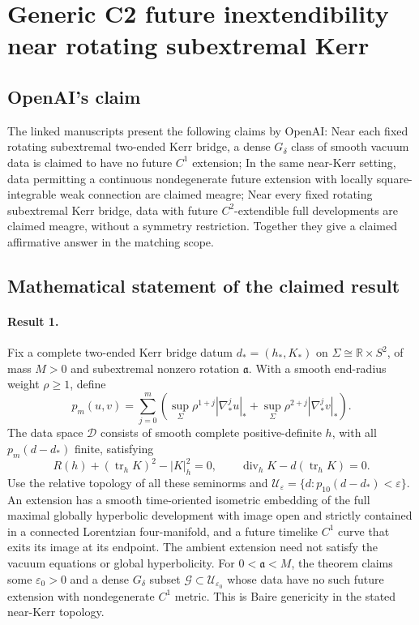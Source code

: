 \documentclass[11pt]{article}
\begin{document}
\section*{Generic C2 future inextendibility near rotating subextremal Kerr}

\subsection{OpenAI's claim}
The linked manuscripts present the following claims by OpenAI: Near each fixed rotating subextremal two-ended Kerr bridge, a dense $G_\delta$ class of smooth vacuum data is claimed to have no future $C^1$ extension; In the same near-Kerr setting, data permitting a continuous nondegenerate future extension with locally square-integrable weak connection are claimed meagre; Near every fixed rotating subextremal Kerr bridge, data with future $C^2$-extendible full developments are claimed meagre, without a symmetry restriction. Together they give a claimed affirmative answer in the matching scope.

\subsection{Mathematical statement of the claimed result}
\paragraph{Result 1.} Fix a complete two-ended Kerr bridge datum \(d_*=(h_*,K_*)\) on \(\Sigma\cong\mathbb R\times S^2\), of mass \(M>0\) and subextremal nonzero rotation \(\mathfrak a\). With a smooth end-radius weight \(\rho\ge1\), define
\[
 p_m(u,v)=\sum_{j=0}^m\left(\sup_\Sigma\rho^{1+j}|\nabla_*^ju|_*+
 \sup_\Sigma\rho^{2+j}|\nabla_*^jv|_*\right).
\]
The data space \(\mathcal D\) consists of smooth complete positive-definite \(h\), with all \(p_m(d-d_*)\) finite, satisfying
\[
 R(h)+(\operatorname{tr}_hK)^2-|K|_h^2=0,\qquad
 \operatorname{div}_hK-d(\operatorname{tr}_hK)=0.
\]
Use the relative topology of all these seminorms and \(\mathcal U_\varepsilon=\{d:p_{10}(d-d_*)<\varepsilon\}\). An extension has a smooth time-oriented isometric embedding of the full maximal globally hyperbolic development with image open and strictly contained in a connected Lorentzian four-manifold, and a future timelike \(C^1\) curve that exits its image at its endpoint. The ambient extension need not satisfy the vacuum equations or global hyperbolicity. For \(0<\mathfrak a<M\), the theorem claims some \(\varepsilon_0>0\) and a dense \(G_\delta\) subset \(\mathcal G\subset\mathcal U_{\varepsilon_0}\) whose data have no such future extension with nondegenerate \(C^1\) metric. This is Baire genericity in the stated near-Kerr topology.
\end{document}
